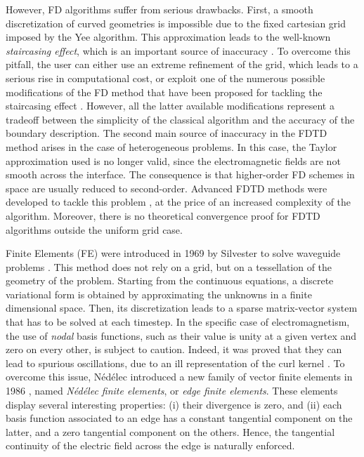 

However, FD algorithms suffer from serious drawbacks. First, a smooth discretization of curved geometries is impossible due to the fixed cartesian grid imposed by the Yee algorithm. This approximation leads to the well-known \emph{staircasing effect}, which is an important source of inaccuracy \cite{Ditkowski1}. To overcome this pitfall, the user can either use an extreme refinement of the grid, which leads to a serious rise in computational cost, or exploit one of the numerous possible modifications of the FD method that have been proposed for tackling the staircasing effect \cite{Hao1}. However, all the latter available modifications represent a tradeoff between the simplicity of the classical algorithm and the accuracy of the boundary description. The second main source of inaccuracy in the FDTD method arises in the case of heterogeneous problems. In this case, the Taylor approximation used is no longer valid, since the electromagnetic fields are not smooth across the interface. The consequence is that higher-order FD schemes in space are usually reduced to second-order. Advanced FDTD methods were developed to tackle this problem \cite{Taflove1}, at the price of an increased complexity of the algorithm. Moreover, there is no theoretical convergence proof for FDTD algorithms outside the uniform grid case.

Finite Elements (FE) were introduced in 1969 by Silvester to solve waveguide problems \cite{Silvester1}. This method does not rely on a grid, but on a tessellation of the geometry of the problem. Starting from the continuous equations, a discrete variational form is obtained by approximating the unknowns in a finite dimensional space. Then, its discretization leads to a sparse matrix-vector system that has to be solved at each timestep. In the specific case of electromagnetism, the use of \emph{nodal} basis functions, \eg such as their value is unity at a given vertex and zero on every other, is subject to caution. Indeed, it was proved that they can lead to spurious oscillations, due to an ill representation of the curl kernel \cite{Sun1}. To overcome this issue, N\'ed\'elec introduced a new family of vector finite elements in 1986 \cite{Nedelec1}, named \emph{N\'ed\'elec finite elements}, or \emph{edge finite elements}. These elements display several interesting properties: (i) their divergence is zero, and (ii) each basis function associated to an edge has a constant tangential component on the latter, and a zero tangential component on the others. Hence, the tangential continuity of the electric field across the edge is naturally enforced.

